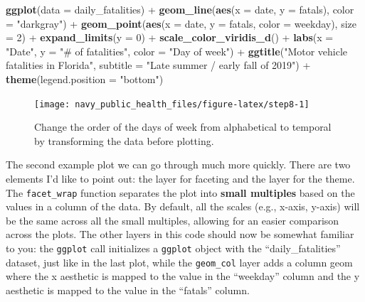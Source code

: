 \documentclass[]{tufte-book}
\newenvironment{Shaded}{}{}
\newcommand{\DataTypeTok}[1]{\textcolor[rgb]{0.56,0.13,0.00}{#1}}
\newcommand{\DecValTok}[1]{\textcolor[rgb]{0.25,0.63,0.44}{#1}}
\newcommand{\KeywordTok}[1]{\textcolor[rgb]{0.00,0.44,0.13}{\textbf{#1}}}
\newcommand{\NormalTok}[1]{#1}
\newcommand{\OperatorTok}[1]{\textcolor[rgb]{0.40,0.40,0.40}{#1}}
\newcommand{\StringTok}[1]{\textcolor[rgb]{0.25,0.44,0.63}{#1}}
\begin{document}
\begin{Shaded}
\begin{Highlighting}[]
\KeywordTok{ggplot}\NormalTok{(}\DataTypeTok{data =}\NormalTok{ daily_fatalities) }\OperatorTok{+}\StringTok{ }\KeywordTok{geom_line}\NormalTok{(}\KeywordTok{aes}\NormalTok{(}\DataTypeTok{x =}\NormalTok{ date, }
    \DataTypeTok{y =}\NormalTok{ fatals), }\DataTypeTok{color =} \StringTok{"darkgray"}\NormalTok{) }\OperatorTok{+}\StringTok{ }\KeywordTok{geom_point}\NormalTok{(}\KeywordTok{aes}\NormalTok{(}\DataTypeTok{x =}\NormalTok{ date, }
    \DataTypeTok{y =}\NormalTok{ fatals, }\DataTypeTok{color =}\NormalTok{ weekday), }\DataTypeTok{size =} \DecValTok{2}\NormalTok{) }\OperatorTok{+}\StringTok{ }
\StringTok{    }\KeywordTok{expand_limits}\NormalTok{(}\DataTypeTok{y =} \DecValTok{0}\NormalTok{) }\OperatorTok{+}\StringTok{ }\KeywordTok{scale_color_viridis_d}\NormalTok{() }\OperatorTok{+}\StringTok{ }
\StringTok{    }\KeywordTok{labs}\NormalTok{(}\DataTypeTok{x =} \StringTok{"Date"}\NormalTok{, }\DataTypeTok{y =} \StringTok{"# of fatalities"}\NormalTok{, }\DataTypeTok{color =} \StringTok{"Day of week"}\NormalTok{) }\OperatorTok{+}\StringTok{ }
\StringTok{    }\KeywordTok{ggtitle}\NormalTok{(}\StringTok{"Motor vehicle fatalities in Florida"}\NormalTok{, }
        \DataTypeTok{subtitle =} \StringTok{"Late summer / early fall of 2019"}\NormalTok{) }\OperatorTok{+}\StringTok{ }
\StringTok{    }\KeywordTok{theme}\NormalTok{(}\DataTypeTok{legend.position =} \StringTok{"bottom"}\NormalTok{)}
\end{Highlighting}
\end{Shaded}

\begin{figure}
\texttt{[image: navy\_public\_health\_files/figure-latex/step8-1]} \caption[Change the order of the days of week from alphabetical to temporal by transforming the data before plotting]{Change the order of the days of week from alphabetical to temporal by transforming the data before plotting.}\label{fig:step8}
\end{figure}

The second example plot we can go through much more quickly. There are two
elements I'd like to point out: the layer for faceting and the layer for the theme.
The \texttt{facet\_wrap} function separates the plot into \textbf{small multiples}
based on the values in a column of the data. By default, all the scales (e.g., x-axis,
y-axis) will be the same across all the small multiples, allowing for an easier
comparison across the plots. The other layers in this code should now be somewhat
familiar to you: the \texttt{ggplot} call initializes a \texttt{ggplot} object with the
``daily\_fatalities'' dataset, just like in the last plot, while the \texttt{geom\_col} layer
adds a column geom where the x aesthetic is mapped to the value in the ``weekday''
column and the y aesthetic is mapped to the value in the ``fatals'' column.
\end{document}
